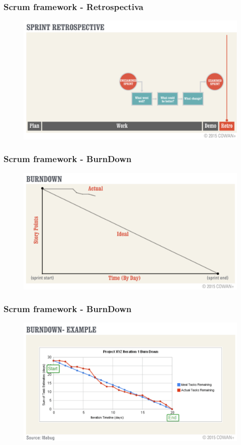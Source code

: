 \begin{frame}
 \frametitle{Scrum framework -  Retrospectiva}
  \begin{figure}
   \centering
   \includegraphics[width = \textwidth]{figs/fases_sprint_retrospective.png}
  \end{figure}
\end{frame}

\begin{frame}
 \frametitle{Scrum framework -  BurnDown}
  \begin{figure}
   \centering
   \includegraphics[width = \textwidth]{figs/fases_burndown.png}
  \end{figure}
\end{frame}

\begin{frame}
 \frametitle{Scrum framework -  BurnDown}
  \begin{figure}
   \centering
   \includegraphics[width = \textwidth]{figs/fases_burndown_exemplo.png}
  \end{figure}
\end{frame}

